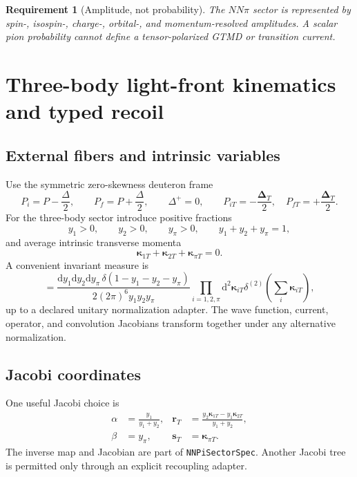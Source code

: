 \documentclass[11pt]{article}
\newtheorem{requirement}[definition]{Requirement}
\newcommand{\DT}{\bm{\Delta}_{T}}
\newcommand{\dd}{\mathrm{d}}
\newcommand{\PionSector}{\texttt{NNPiSectorSpec}}
\begin{document}
\begin{requirement}[Amplitude, not probability]
The \(NN\pi\) sector is represented by spin-, isospin-, charge-, orbital-, and
momentum-resolved amplitudes.  A scalar pion probability cannot define a
tensor-polarized GTMD or transition current.
\end{requirement}

\section{Three-body light-front kinematics and typed recoil}
\label{sec:kinematics}

\subsection{External fibers and intrinsic variables}

Use the symmetric zero-skewness deuteron frame
\begin{equation}
 P_i=P-\frac{\Delta}{2},
 \qquad
 P_f=P+\frac{\Delta}{2},
 \qquad
 \Delta^+=0,
 \qquad
 P_{iT}=-\frac{\DT}{2},
 \quad
 P_{fT}=+\frac{\DT}{2}.
 \label{eq:n1-symmetric-frame}
\end{equation}
For the three-body sector introduce positive fractions
\begin{equation}
 y_1>0,
 \qquad y_2>0,
 \qquad y_\pi>0,
 \qquad y_1+y_2+y_\pi=1,
 \label{eq:threebody-fractions}
\end{equation}
and average intrinsic transverse momenta
\begin{equation}
 \bm\kappa_{1T}+\bm\kappa_{2T}+\bm\kappa_{\pi T}=0.
 \label{eq:threebody-closure}
\end{equation}
A convenient invariant measure is
\begin{equation}
 [\dd\Gamma_3]
 =
 \frac{\dd y_1\dd y_2\dd y_\pi\,
 \delta(1-y_1-y_2-y_\pi)}
 {2(2\pi)^6 y_1y_2y_\pi}
 \prod_{i=1,2,\pi}\dd^2\bm\kappa_{iT}
 \delta^{(2)}\!\left(\sum_i\bm\kappa_{iT}\right),
 \label{eq:threebody-measure}
\end{equation}
up to a declared unitary normalization adapter.  The wave function, current,
operator, and convolution Jacobians transform together under any alternative
normalization.

\subsection{Jacobi coordinates}

One useful Jacobi choice is
\begin{align}
 \alpha&=\frac{y_1}{y_1+y_2},
 &
 \bm r_T&=
 \frac{y_2\bm\kappa_{1T}-y_1\bm\kappa_{2T}}{y_1+y_2},
 \label{eq:nn-jacobi}\\
 \beta&=y_\pi,
 &
 \bm s_T&=\bm\kappa_{\pi T}.
 \label{eq:pion-jacobi}
\end{align}
The inverse map and Jacobian are part of \PionSector.  Another Jacobi tree is
permitted only through an explicit recoupling adapter.
\end{document}
